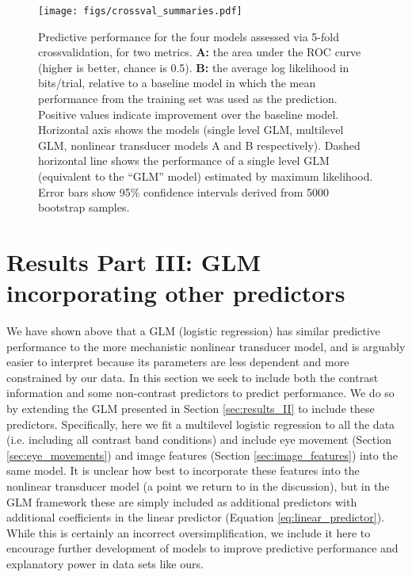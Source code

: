 \documentclass[11pt,a4paper]{article}
\begin{document}
{ %
 \begin{figure}[H]
 \begin{center}
 \texttt{[image: figs/crossval\_summaries.pdf]}
 \end{center}
 \caption{
Predictive performance for the four models assessed via 5-fold crossvalidation, for two metrics.
\textbf{A:} the area under the ROC curve (higher is better, chance is 0.5).
\textbf{B:}  the average log likelihood in bits/trial, relative to a baseline model in which the mean performance from the training set was used as the prediction.
Positive values indicate improvement over the baseline model.
Horizontal axis shows the models (single level GLM, multilevel GLM, nonlinear transducer models A and B respectively).
Dashed horizontal line shows the performance of a single level GLM (equivalent to the ``GLM'' model) estimated by maximum likelihood.
Error bars show 95\% confidence intervals derived from 5000 bootstrap samples.
 }
 \label{fig:crossval_I}
 \end{figure}

\section{Results Part III: GLM incorporating other predictors}
\label{sec:results_III}

We have shown above that a GLM (logistic regression) has similar predictive performance to the more mechanistic nonlinear transducer model, and is arguably easier to interpret because its parameters are less dependent and more constrained by our data.
In this section we seek to include both the contrast information and some non-contrast predictors to predict performance.
We do so by extending the GLM presented in Section \ref{sec:results_II} to include these predictors.
Specifically, here we fit a multilevel logistic regression to all the data (i.e. including all contrast band conditions) and include eye movement (Section \ref{sec:eye_movements}) and image features (Section \ref{sec:image_features}) into the same model.
It is unclear how best to incorporate these features into the nonlinear transducer model (a point we return to in the discussion), but in the GLM framework these are simply included as additional predictors with additional coefficients in the linear predictor (Equation \ref{eq:linear_predictor}).
While this is certainly an incorrect oversimplification, we include it here to encourage further development of models to improve predictive performance and explanatory power in data sets like ours.

}
\end{document}
